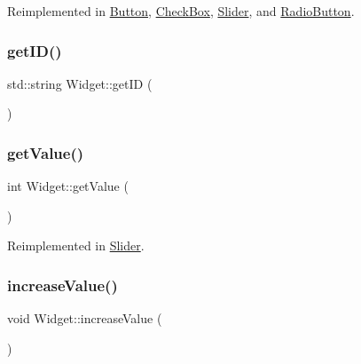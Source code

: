 Reimplemented in \mbox{\hyperlink{class_button_afe48c308771dd21dfa1539e930ca60b9}{Button}}, \mbox{\hyperlink{class_check_box_a86a6399e17216849708c07ed51df3510}{Check\+Box}}, \mbox{\hyperlink{class_slider_aacedd16fdfd8b44067e0c8fd5b908b69}{Slider}}, and \mbox{\hyperlink{class_radio_button_a74c525b924c233535c3ee6a03fe89e3d}{Radio\+Button}}.

\mbox{\label{class_widget_aa7145e34616230d24adbf8bf9f8194e2}} 
\subsubsection{\texorpdfstring{getID()}{getID()}}
{\footnotesize\ttfamily std\+::string Widget\+::get\+ID (\begin{DoxyParamCaption}{ }\end{DoxyParamCaption})}

\mbox{\label{class_widget_a3b53c2690d2b33fceb73e9059458480f}} 
\subsubsection{\texorpdfstring{getValue()}{getValue()}}
{\footnotesize\ttfamily int Widget\+::get\+Value (\begin{DoxyParamCaption}{ }\end{DoxyParamCaption})\hspace{0.3cm}{\ttfamily [virtual]}}



Reimplemented in \mbox{\hyperlink{class_slider_a9e72ef47f0b78846d776aa75caa4113d}{Slider}}.

\mbox{\label{class_widget_a4d4df2961aeaa579ef511a546e6276c5}} 
\subsubsection{\texorpdfstring{increaseValue()}{increaseValue()}}
{\footnotesize\ttfamily void Widget\+::increase\+Value (\begin{DoxyParamCaption}{ }\end{DoxyParamCaption})\hspace{0.3cm}{\ttfamily [virtual]}}



